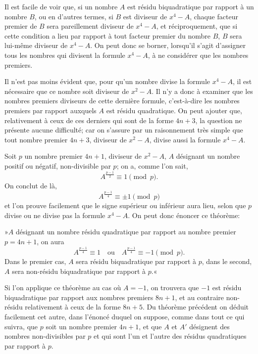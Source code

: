 \documentclass[11pt]{article}
\newcommand{\unitid}[1]{\hypertarget{#1}{}}
\begin{document}
\unitid{dirichlet.v1.p04a.par.003}Il est facile de voir que, si un nombre $A$ est résidu biquadratique par rapport à un nombre $B$, ou en d'autres termes, si $B$ est diviseur de $x^4-A$, chaque facteur premier de $B$ sera pareillement diviseur de $x^4-A$, et réciproquement, que si cette condition a lieu par rapport à tout facteur premier du nombre $B$, $B$ sera lui-même diviseur de $x^4-A$. On peut donc se borner, lorsqu'il s'agit d'assigner tous les nombres qui divisent la formule $x^4-A$, à ne considérer que les nombres premiers.

\unitid{dirichlet.v1.p04a.par.004}Il n'est pas moins évident que, pour qu'un nombre divise la formule $x^4-A$, il est nécessaire que ce nombre soit diviseur de $x^2-A$. Il n'y a donc à examiner que les nombres premiers diviseurs de cette dernière formule, c'est-à-dire les nombres premiers par rapport auxquels $A$ est résidu quadratique. On peut ajouter que, relativement à ceux de ces derniers qui sont de la forme $4n+3$, la question ne présente aucune difficulté; car on s'assure par un raisonnement très simple que tout nombre premier $4n+3$, diviseur de $x^2-A$, divise aussi la formule $x^4-A$.

\unitid{dirichlet.v1.p04a.par.005}Soit $p$ un nombre premier $4n+1$, diviseur de $x^2-A$, $A$ désignant un nombre positif ou négatif, non-divisible par $p$; on a, comme l'on sait,
\[
 A^{\frac{p-1}{2}}\equiv 1 \pmod p.
\]
On conclut de là,
\[
 A^{\frac{p-1}{4}}\equiv \pm 1 \pmod p
\]
et l'on prouve facilement que le signe supérieur ou inférieur aura lieu, selon que $p$ divise ou ne divise pas la formule $x^4-A$. On peut donc énoncer ce théorème:

\unitid{dirichlet.v1.p04a.thm.001}»$A$ désignant un nombre résidu quadratique par rapport au nombre premier $p=4n+1$, on aura
\[
 A^{\frac{p-1}{4}}\equiv 1\quad\text{ou}\quad A^{\frac{p-1}{4}}\equiv -1 \pmod p.
\]
Dans le premier cas, $A$ sera résidu biquadratique par rapport à $p$, dans le second, $A$ sera non-résidu biquadratique par rapport à $p$.«

\unitid{dirichlet.v1.p04a.par.006}Si l'on applique ce théorème au cas où $A=-1$, on trouvera que $-1$ est résidu biquadratique par rapport aux nombres premiers $8n+1$, et au contraire non-résidu relativement à ceux de la forme $8n+5$. Du théorème précédent on déduit facilement cet autre, dans l'énoncé duquel on suppose, comme dans tout ce qui suivra, que $p$ soit un nombre premier $4n+1$, et que $A$ et $A'$ désignent des nombres non-divisibles par $p$ et qui sont l'un et l'autre des résidus quadratiques par rapport à $p$.
\end{document}
